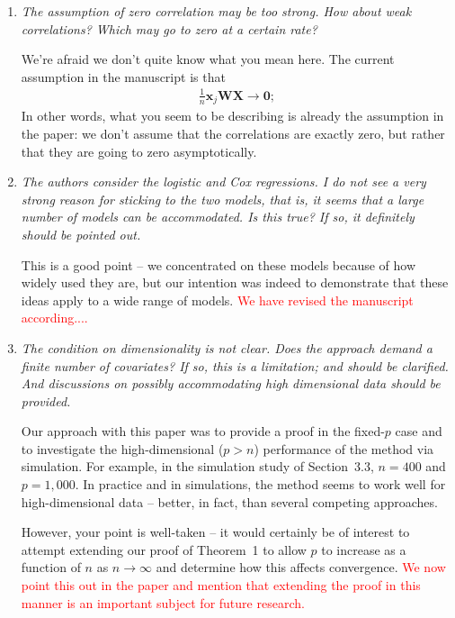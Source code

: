 \documentclass{article}
\providecommand{\note}[1]{\textcolor{red}{#1}}
\begin{document}
\begin{enumerate}
\item {\em The assumption of zero correlation may be too strong. How about weak correlations? Which may go to zero at a certain rate?}

  We're afraid we don't quite know what you mean here.  The current assumption in the manuscript is that
  \begin{align*}
    \frac{1}{n}\mathbf{x}_j\mathbf{W}\mathbf{X} \to \mathbf{0};
  \end{align*}
  In other words, what you seem to be describing is already the assumption in the paper: we don't assume that the correlations are exactly zero, but rather that they are going to zero asymptotically.  

\item {\em The authors consider the logistic and Cox regressions. I do not see a very strong reason for sticking to the two models, that is, it seems that a large number of models can be accommodated. Is this true? If so, it definitely should be pointed out.}

  This is a good point -- we concentrated on these models because of how widely used they are, but our intention was indeed to demonstrate that these ideas apply to a wide range of models.  \note{We have revised the manuscript according....}

\item {\em The condition on dimensionality is not clear. Does the approach demand a finite number of covariates? If so, this is a limitation; and should be clarified. And discussions on possibly accommodating high dimensional data should be provided.}

  Our approach with this paper was to provide a proof in the fixed-$p$ case and to investigate the high-dimensional ($p>n$) performance of the method via simulation.  For example, in the simulation study of Section~3.3, $n=400$ and $p=1,000$.  In practice and in simulations, the method seems to work well for high-dimensional data -- better, in fact, than several competing approaches.

  However, your point is well-taken -- it would certainly be of interest to attempt extending our proof of Theorem~1 to allow $p$ to increase as a function of $n$ as $n \to \infty$ and determine how this affects convergence.  \note{We now point this out in the paper and mention that extending the proof in this manner is an important subject for future research.}

\end{enumerate}

%
%
\end{document}
